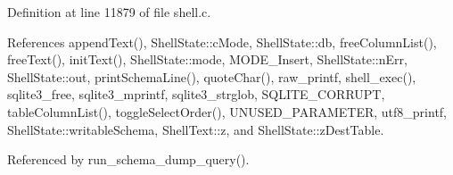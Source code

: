 Definition at line 11879 of file shell.\+c.



References append\+Text(), Shell\+State\+::c\+Mode, Shell\+State\+::db, free\+Column\+List(), free\+Text(), init\+Text(), Shell\+State\+::mode, M\+O\+D\+E\+\_\+\+Insert, Shell\+State\+::n\+Err, Shell\+State\+::out, print\+Schema\+Line(), quote\+Char(), raw\+\_\+printf, shell\+\_\+exec(), sqlite3\+\_\+free, sqlite3\+\_\+mprintf, sqlite3\+\_\+strglob, S\+Q\+L\+I\+T\+E\+\_\+\+C\+O\+R\+R\+U\+PT, table\+Column\+List(), toggle\+Select\+Order(), U\+N\+U\+S\+E\+D\+\_\+\+P\+A\+R\+A\+M\+E\+T\+ER, utf8\+\_\+printf, Shell\+State\+::writable\+Schema, Shell\+Text\+::z, and Shell\+State\+::z\+Dest\+Table.



Referenced by run\+\_\+schema\+\_\+dump\+\_\+query().


